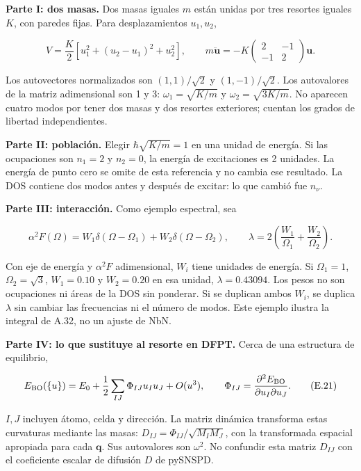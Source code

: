 \documentclass[
  spanish,
  10pt,
  a4paper,
]{article}
\begin{document}
\textbf{Parte I: dos masas.} Dos masas iguales \(m\) están unidas por
tres resortes iguales \(K\), con paredes fijas. Para desplazamientos
\(u_1,u_2\),

\[
V=\frac K2[u_1^2+(u_2-u_1)^2+u_2^2],\qquad
m\ddot{\mathbf u}=-K\begin{pmatrix}2&-1\\-1&2\end{pmatrix}\mathbf u.
\tag{E.19}
\]

Los autovectores normalizados son \((1,1)/\sqrt2\) y \((1,-1)/\sqrt2\).
Los autovalores de la matriz adimensional son 1 y 3:
\(\omega_1=\sqrt{K/m}\) y \(\omega_2=\sqrt{3K/m}\). No aparecen cuatro
modos por tener dos masas y dos resortes exteriores; cuentan los grados
de libertad independientes.

\textbf{Parte II: población.} Elegir \(\hbar\sqrt{K/m}=1\) en una unidad
de energía. Si las ocupaciones son \(n_1=2\) y \(n_2=0\), la energía de
excitaciones es 2 unidades. La energía de punto cero se omite de esta
referencia y no cambia ese resultado. La DOS contiene dos modos antes y
después de excitar: lo que cambió fue \(n_\nu\).

\textbf{Parte III: interacción.} Como ejemplo espectral, sea

\[
\alpha^2F(\Omega)=W_1\delta(\Omega-\Omega_1)
+W_2\delta(\Omega-\Omega_2),\qquad
\lambda=2\left(\frac{W_1}{\Omega_1}+\frac{W_2}{\Omega_2}\right).
\tag{E.20}
\]

Con eje de energía y \(\alpha^2F\) adimensional, \(W_i\) tiene unidades
de energía. Si \(\Omega_1=1\), \(\Omega_2=\sqrt3\), \(W_1=0.10\) y
\(W_2=0.20\) en esa unidad, \(\lambda=0.43094\). Los pesos no son
ocupaciones ni áreas de la DOS sin ponderar. Si se duplican ambos
\(W_i\), se duplica \(\lambda\) sin cambiar las frecuencias ni el número
de modos. Este ejemplo ilustra la integral de A.32, no un ajuste de NbN.

\textbf{Parte IV: lo que sustituye al resorte en DFPT.} Cerca de una
estructura de equilibrio,

\[
E_{\rm BO}(\{u\})=E_0+\frac12\sum_{IJ}\Phi_{IJ}u_Iu_J+O(u^3),
\qquad \Phi_{IJ}=\frac{\partial^2E_{\rm BO}}{\partial u_I\partial u_J}.
\tag{E.21}
\]

\(I,J\) incluyen átomo, celda y dirección. La matriz dinámica transforma
estas curvaturas mediante las masas: \(D_{IJ}=\Phi_{IJ}/\sqrt{M_IM_J}\),
con la transformada espacial apropiada para cada \(\mathbf q\). Sus
autovalores son \(\omega^2\). No confundir esta matriz \(D_{IJ}\) con el
coeficiente escalar de difusión \(D\) de pySNSPD.
\end{document}
